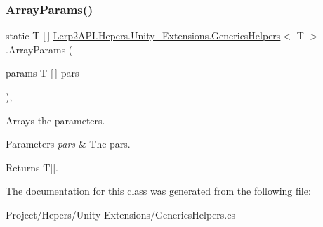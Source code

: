 \subsubsection{\texorpdfstring{Array\+Params()}{ArrayParams()}}
{\footnotesize\ttfamily static T \mbox{[}$\,$\mbox{]} \hyperlink{class_lerp2_a_p_i_1_1_hepers_1_1_unity___extensions_1_1_generics_helpers}{Lerp2\+A\+P\+I.\+Hepers.\+Unity\+\_\+\+Extensions.\+Generics\+Helpers}$<$ T $>$.Array\+Params (\begin{DoxyParamCaption}\item[{params T \mbox{[}$\,$\mbox{]}}]{pars }\end{DoxyParamCaption})\hspace{0.3cm}{\ttfamily [inline]}, {\ttfamily [static]}}



Arrays the parameters. 


\begin{DoxyParams}{Parameters}
{\em pars} & The pars.\\
\hline
\end{DoxyParams}
\begin{DoxyReturn}{Returns}
T\mbox{[}\mbox{]}.
\end{DoxyReturn}


The documentation for this class was generated from the following file\+:\begin{DoxyCompactItemize}
\item 
Project/\+Hepers/\+Unity Extensions/Generics\+Helpers.\+cs\end{DoxyCompactItemize}
